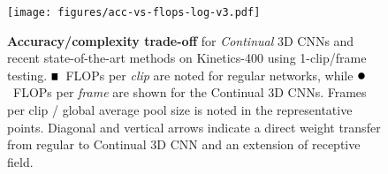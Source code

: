 



\begin{figure}
    \centering
    \texttt{[image: figures/acc-vs-flops-log-v3.pdf]}
    \caption{
        \textbf{Accuracy/complexity trade-off} for \textit{Continual} 3D CNNs and recent state-of-the-art methods on Kinetics-400 using 1-clip/frame testing. 
        $\ssquare$~FLOPs per \textit{clip} are noted for regular networks, while $\sbullet$~FLOPs per \textit{frame} are shown for the Continual 3D CNNs. 
        Frames per clip / global average pool size is noted in the representative points.
        Diagonal and vertical arrows indicate a direct weight transfer from regular to Continual 3D CNN and an extension of receptive field.
    }
    \label{fig:test-acc-vs-flops}
\end{figure}